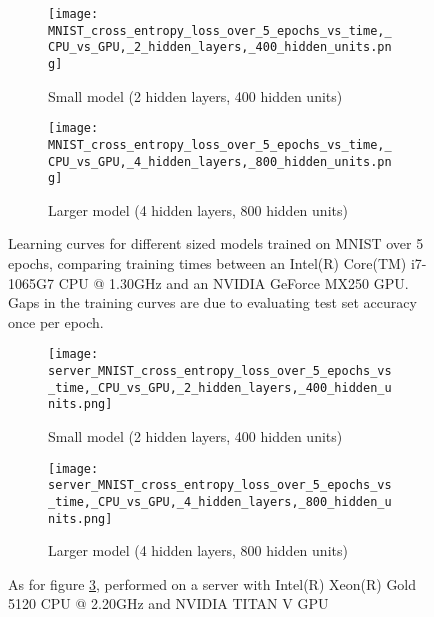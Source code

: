 \begin{figure}
    \centering
    \begin{subfigure}{0.45\textwidth}
        \centering
        \texttt{[image: MNIST\_cross\_entropy\_loss\_over\_5\_epochs\_vs\_time,\_CPU\_vs\_GPU,\_2\_hidden\_layers,\_400\_hidden\_units.png]}
        \caption{Small model (2 hidden layers, 400 hidden units)}
        \label{fig:mnist small}
    \end{subfigure}
    \begin{subfigure}{0.45\textwidth}
        \centering
        \texttt{[image: MNIST\_cross\_entropy\_loss\_over\_5\_epochs\_vs\_time,\_CPU\_vs\_GPU,\_4\_hidden\_layers,\_800\_hidden\_units.png]}
        \caption{Larger model (4 hidden layers, 800 hidden units)}
        \label{fig:mnist larger}
    \end{subfigure}
    \caption{Learning curves for different sized models trained on MNIST over 5 epochs, comparing training times between an Intel(R) Core(TM) i7-1065G7 CPU @ 1.30GHz and an NVIDIA GeForce MX250 GPU. Gaps in the training curves are due to evaluating test set accuracy once per epoch.}
    \label{fig:mnist cpu gpu}
\end{figure}
\begin{figure}
    \centering
    \begin{subfigure}{0.45\textwidth}
        \centering
        \texttt{[image: server\_MNIST\_cross\_entropy\_loss\_over\_5\_epochs\_vs\_time,\_CPU\_vs\_GPU,\_2\_hidden\_layers,\_400\_hidden\_units.png]}
        \caption{Small model (2 hidden layers, 400 hidden units)}
        \label{fig:mnist small server}
    \end{subfigure}
    \begin{subfigure}{0.45\textwidth}
        \centering
        \texttt{[image: server\_MNIST\_cross\_entropy\_loss\_over\_5\_epochs\_vs\_time,\_CPU\_vs\_GPU,\_4\_hidden\_layers,\_800\_hidden\_units.png]}
        \caption{Larger model (4 hidden layers, 800 hidden units)}
        \label{fig:mnist larger server}
    \end{subfigure}
    \caption{As for figure \ref{fig:mnist cpu gpu}, performed on a server with Intel(R) Xeon(R) Gold 5120 CPU @ 2.20GHz and NVIDIA TITAN V GPU}
    \label{fig:mnist cpu gpu server}
\end{figure}
